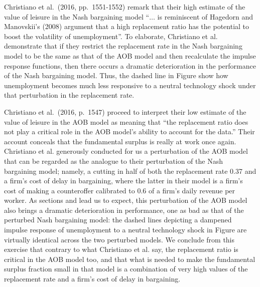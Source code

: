  Christiano et al.\ (2016, pp.~1551-1552) remark that
   their high estimate of the value of leisure in the
Nash bargaining model ``$\ldots$  is reminiscent of Hagedorn
and Manovskii's (2008) argument that a high replacement ratio has
the potential to boost the volatility of unemployment''.
To elaborate, Christiano et al. demonstrate  that if they restrict the replacement
rate in the Nash bargaining model to be the same as that of the
AOB model and then recalculate the impulse response functions, then there occurs
a dramatic deterioration in the performance of the Nash
bargaining model. Thus,  the dashed line in Figure 
show how  unemployment becomes much less responsive to
a neutral technology shock under that perturbation in the replacement rate.

Christiano et al.\ (2016, p.~1547) proceed to interpret  their low estimate of the value of leisure in the
AOB model as meaning that ``the replacement ratio does not play a critical role
in the AOB model's ability to account for the data.''
Their account conceals that the fundamental surplus  is really at work once
again. Christiano et al.
 generously conducted for us
a perturbation of the AOB model that can be regarded as the
analogue to their perturbation of the Nash bargaining model;
namely, a cutting in half
of both the replacement rate 0.37 and a firm's cost of delay
in bargaining, where the latter in their model is a firm's
cost of  making a counteroffer  calibrated to 0.6 of a firm's
daily revenue per worker.
As  sections
 and  lead us to expect, this
perturbation of the AOB model also brings a dramatic
deterioration in performance, one as bad as that of the perturbed Nash
bargaining model: the dashed lines depicting a
dampened impulse response of unemployment to a neutral
technology shock in Figure  
are virtually identical across the two perturbed models.
We conclude from this exercise that contrary to what Christiano et al. say,  the replacement ratio is  critical
in the AOB model too, and that  what is needed to make the fundamental surplus fraction small
in that model
is a combination of very high
values of the replacement rate and a firm's cost of delay in
bargaining.









